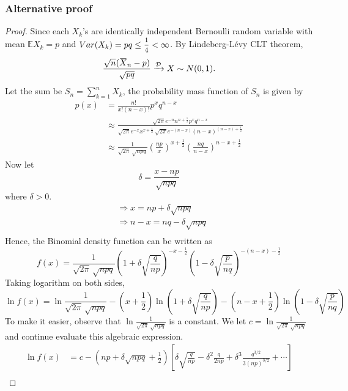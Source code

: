 \subsubsection*{Alternative proof}
\begin{proof}
    Since each $X_k$'s are identically independent Bernoulli random variable with mean $\mathbb{E}X_k = p$ and 
    $Var(X_k) = pq \leq \mfrac{1}{4} < \infty$. By Lindeberg-L\'evy CLT theorem,
    \begin{equation}
        \frac{\sqrt{n} (\ols{X}_n - p)}{\sqrt{pq}} \xrightarrow[]{\mathcal{D}} X \sim N(0,1).
    \end{equation}
    Let the sum be $S_n = \sum^n_{k=1} X_k$, the probability mass function of $S_n$ is given by 
    \begin{align*}
        p(x) &= \frac{n!}{x!(n-x)!}p^x q^{n-x}\\
        &\approx \frac{\sqrt{2\pi}e^{-n}n^{n+\frac{1}{2}} p^x q^{n-x}}{\sqrt{2\pi}e^{-x} x^{x+\frac{1}{2}}\, \sqrt{2\pi}e^{-(n-x)} (n-x)^{(n-x) + \frac{1}{2}}}\\
        &\approx \frac{1}{\sqrt{2\pi}\, \sqrt{npq}} \left(\frac{np}{x}\right)^{x+\frac{1}{2}} \left(\frac{nq}{n-x}\right)^{n-x+\frac{1}{2}}
    \end{align*}
    Now let 
    \[
        \delta = \frac{x - np}{\sqrt{npq}}
    \]
    where $\delta > 0$. 
    \begin{align*}
        &\Rightarrow x = np + \delta \sqrt{npq}\\
        &\Rightarrow n - x = nq - \delta \sqrt{npq}\\
    \end{align*}
    Hence, the Binomial density function can be written as 
    \[
        f(x) = \frac{1}{\sqrt{2\pi} \, \sqrt{npq}} \left( 1 + \delta \sqrt{\frac{q}{np}}\right)^{-x-\frac{1}{2}} \left( 1 - \delta \sqrt{\frac{p}{nq}}\right)^{-(n-x) - \frac{1}{2}}
    \]
    Taking logarithm on both sides, 
    \[
        \ln f(x) = \ln \frac{1}{\sqrt{2\pi} \, \sqrt{npq}} - \left(x + \frac{1}{2}\right)\ln \left( 1 + \delta \sqrt{\frac{q}{np}}\right) - \left( n - x + \frac{1}{2} \right)
        \ln \left( 1 - \delta \sqrt{\frac{p}{nq}}\right)
    \]
    To make it easier, observe that $\ln \frac{1}{\sqrt{2\pi} \, \sqrt{npq}}$ is a constant. We let $c = \ln \frac{1}{\sqrt{2\pi} \, \sqrt{npq}}$ and continue evaluate 
    this algebraic expression.
    \begin{align*}
        \ln f(x) &= c - \left(np + \delta \sqrt{npq} + \frac{1}{2} \right)
        \left[ \delta \sqrt{\frac{q}{np}} - \delta^2 \frac{q}{2np} + \delta^3 \frac{q^{3/2}}{3(np)^{3/2}} + \cdots \right]\\

\end{align*}
\end{proof}
